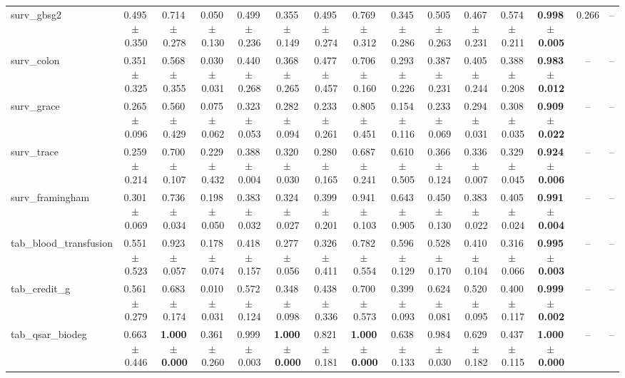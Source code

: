 \documentclass[8pt]{extarticle}
\begin{document}
\begin{longtable}{l*{14}{c}}
surv\_gbsg2 & 0.495\,$\pm$\,0.350 & 0.714\,$\pm$\,0.278 & 0.050\,$\pm$\,0.130 & 0.499\,$\pm$\,0.236 & 0.355\,$\pm$\,0.149 & 0.495\,$\pm$\,0.274 & 0.769\,$\pm$\,0.312 & 0.345\,$\pm$\,0.286 & 0.505\,$\pm$\,0.263 & 0.467\,$\pm$\,0.231 & 0.574\,$\pm$\,0.211 & \textbf{0.998\,$\pm$\,0.005} & 0.266 & -- \\
surv\_colon & 0.351\,$\pm$\,0.325 & 0.568\,$\pm$\,0.355 & 0.030\,$\pm$\,0.031 & 0.440\,$\pm$\,0.268 & 0.368\,$\pm$\,0.265 & 0.477\,$\pm$\,0.457 & 0.706\,$\pm$\,0.160 & 0.293\,$\pm$\,0.226 & 0.387\,$\pm$\,0.231 & 0.405\,$\pm$\,0.244 & 0.388\,$\pm$\,0.208 & \textbf{0.983\,$\pm$\,0.012} & -- & -- \\
surv\_grace & 0.265\,$\pm$\,0.096 & 0.560\,$\pm$\,0.429 & 0.075\,$\pm$\,0.062 & 0.323\,$\pm$\,0.053 & 0.282\,$\pm$\,0.094 & 0.233\,$\pm$\,0.261 & 0.805\,$\pm$\,0.451 & 0.154\,$\pm$\,0.116 & 0.233\,$\pm$\,0.069 & 0.294\,$\pm$\,0.031 & 0.308\,$\pm$\,0.035 & \textbf{0.909\,$\pm$\,0.022} & -- & -- \\
surv\_trace & 0.259\,$\pm$\,0.214 & 0.700\,$\pm$\,0.107 & 0.229\,$\pm$\,0.432 & 0.388\,$\pm$\,0.004 & 0.320\,$\pm$\,0.030 & 0.280\,$\pm$\,0.165 & 0.687\,$\pm$\,0.241 & 0.610\,$\pm$\,0.505 & 0.366\,$\pm$\,0.124 & 0.336\,$\pm$\,0.007 & 0.329\,$\pm$\,0.045 & \textbf{0.924\,$\pm$\,0.006} & -- & -- \\
surv\_framingham & 0.301\,$\pm$\,0.069 & 0.736\,$\pm$\,0.034 & 0.198\,$\pm$\,0.050 & 0.383\,$\pm$\,0.032 & 0.324\,$\pm$\,0.027 & 0.399\,$\pm$\,0.201 & 0.941\,$\pm$\,0.103 & 0.643\,$\pm$\,0.905 & 0.450\,$\pm$\,0.130 & 0.383\,$\pm$\,0.022 & 0.405\,$\pm$\,0.024 & \textbf{0.991\,$\pm$\,0.004} & -- & -- \\
tab\_blood\_transfusion & 0.551\,$\pm$\,0.523 & 0.923\,$\pm$\,0.057 & 0.178\,$\pm$\,0.074 & 0.418\,$\pm$\,0.157 & 0.277\,$\pm$\,0.056 & 0.326\,$\pm$\,0.411 & 0.782\,$\pm$\,0.554 & 0.596\,$\pm$\,0.129 & 0.528\,$\pm$\,0.170 & 0.410\,$\pm$\,0.104 & 0.316\,$\pm$\,0.066 & \textbf{0.995\,$\pm$\,0.003} & -- & -- \\
tab\_credit\_g & 0.561\,$\pm$\,0.279 & 0.683\,$\pm$\,0.174 & 0.010\,$\pm$\,0.031 & 0.572\,$\pm$\,0.124 & 0.348\,$\pm$\,0.098 & 0.438\,$\pm$\,0.336 & 0.700\,$\pm$\,0.573 & 0.399\,$\pm$\,0.093 & 0.624\,$\pm$\,0.081 & 0.520\,$\pm$\,0.095 & 0.400\,$\pm$\,0.117 & \textbf{0.999\,$\pm$\,0.002} & -- & -- \\
tab\_qsar\_biodeg & 0.663\,$\pm$\,0.446 & \textbf{1.000\,$\pm$\,0.000} & 0.361\,$\pm$\,0.260 & 0.999\,$\pm$\,0.003 & \textbf{1.000\,$\pm$\,0.000} & 0.821\,$\pm$\,0.181 & \textbf{1.000\,$\pm$\,0.000} & 0.638\,$\pm$\,0.133 & 0.984\,$\pm$\,0.030 & 0.629\,$\pm$\,0.182 & 0.437\,$\pm$\,0.115 & \textbf{1.000\,$\pm$\,0.000} & -- & -- \\

\end{longtable}
\end{document}
